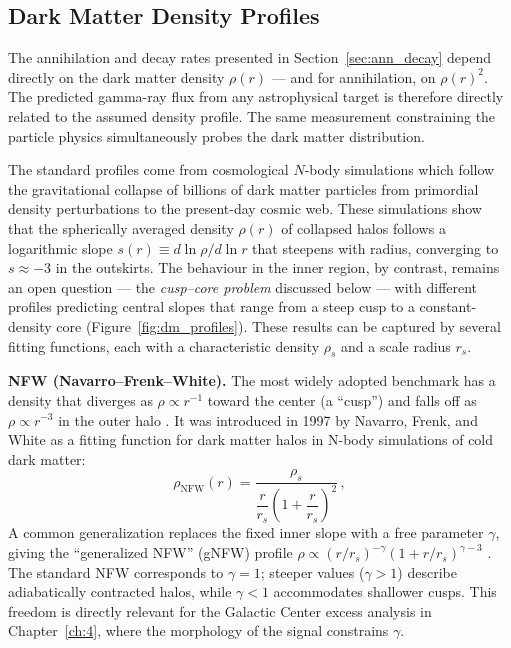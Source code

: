 \subsection{Dark Matter Density Profiles}
\label{sec:density_profiles}

The annihilation and decay rates presented in Section~\ref{sec:ann_decay} depend directly on the dark matter density $\rho(r)$ --- and for annihilation, on $\rho(r)^2$.
The predicted gamma-ray flux from any astrophysical target is therefore directly related to the assumed density profile.
The same measurement constraining the particle physics simultaneously probes the dark matter distribution.

The standard profiles come from cosmological $N$-body simulations which follow the gravitational collapse of billions of dark matter particles from primordial density perturbations to the present-day cosmic web.
These simulations show that the spherically averaged density $\rho(r)$ of collapsed halos follows a logarithmic slope $s(r) \equiv d\ln\rho / d\ln r$ that steepens with radius, converging to $s \approx -3$ in the outskirts.
The behaviour in the inner region, by contrast, remains an open question --- the \textit{cusp--core problem} discussed below --- with different profiles predicting central slopes that range from a steep cusp to a constant-density core (Figure~\ref{fig:dm_profiles}).
These results can be captured by several fitting functions, each with a characteristic density $\rho_s$ and a scale radius $r_s$.

\textbf{NFW (Navarro--Frenk--White).}
The most widely adopted benchmark has a density that diverges as $\rho \propto r^{-1}$ toward the center (a ``cusp'') and falls off as $\rho \propto r^{-3}$ in the outer halo \cite{Navarro:1996gj}. It was introduced in 1997 by Navarro, Frenk, and White as a fitting function for dark matter halos in N-body simulations of cold dark matter:
%
\begin{equation}
	\rho_\text{NFW}(r) = \frac{\rho_s}{\dfrac{r}{r_s}\left(1 + \dfrac{r}{r_s}\right)^2} \,,
	\label{eq:nfw}
\end{equation}
%
A common generalization replaces the fixed inner slope with a free parameter $\gamma$, giving the ``generalized NFW'' (gNFW) profile $\rho \propto (r/r_s)^{-\gamma}(1 + r/r_s)^{\gamma - 3}$ \cite{Cirelli:2024ssz}.
The standard NFW corresponds to $\gamma = 1$; steeper values ($\gamma > 1$) describe adiabatically contracted halos, while $\gamma < 1$ accommodates shallower cusps.
This freedom is directly relevant for the Galactic Center excess analysis in Chapter~\ref{ch:4}, where the morphology of the signal constrains $\gamma$.

